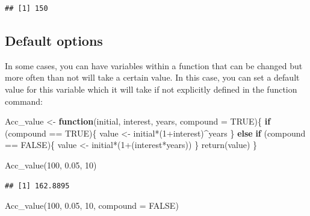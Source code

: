 \documentclass[
]{book}
\newenvironment{Shaded}{\begin{snugshade}}{\end{snugshade}}
\newcommand{\AttributeTok}[1]{\textcolor[rgb]{0.77,0.63,0.00}{#1}}
\newcommand{\ConstantTok}[1]{\textcolor[rgb]{0.00,0.00,0.00}{#1}}
\newcommand{\ControlFlowTok}[1]{\textcolor[rgb]{0.13,0.29,0.53}{\textbf{#1}}}
\newcommand{\DecValTok}[1]{\textcolor[rgb]{0.00,0.00,0.81}{#1}}
\newcommand{\FloatTok}[1]{\textcolor[rgb]{0.00,0.00,0.81}{#1}}
\newcommand{\FunctionTok}[1]{\textcolor[rgb]{0.00,0.00,0.00}{#1}}
\newcommand{\NormalTok}[1]{#1}
\newcommand{\OtherTok}[1]{\textcolor[rgb]{0.56,0.35,0.01}{#1}}
\newcommand{\SpecialCharTok}[1]{\textcolor[rgb]{0.00,0.00,0.00}{#1}}
\theoremstyle{definition}
\theoremstyle{definition}
\theoremstyle{definition}
\theoremstyle{definition}
\theoremstyle{remark}
\begin{document}
\begin{verbatim}
## [1] 150
\end{verbatim}

\hypertarget{default-options}{%
\subsection{Default options}\label{default-options}}

In some cases, you can have variables within a function that can be changed but more often than not will take a certain value. In this case, you can set a default value for this variable which it will take if not explicitly defined in the function command:

\begin{Shaded}
\begin{Highlighting}[]
\NormalTok{Acc\_value }\OtherTok{\textless{}{-}} \ControlFlowTok{function}\NormalTok{(initial, interest, years, }\AttributeTok{compound =} \ConstantTok{TRUE}\NormalTok{)\{}
  \ControlFlowTok{if}\NormalTok{ (compound }\SpecialCharTok{==} \ConstantTok{TRUE}\NormalTok{)\{}
\NormalTok{    value }\OtherTok{\textless{}{-}}\NormalTok{ initial}\SpecialCharTok{*}\NormalTok{(}\DecValTok{1}\SpecialCharTok{+}\NormalTok{interest)}\SpecialCharTok{\^{}}\NormalTok{years}
\NormalTok{  \} }\ControlFlowTok{else} \ControlFlowTok{if}\NormalTok{ (compound }\SpecialCharTok{==} \ConstantTok{FALSE}\NormalTok{)\{}
\NormalTok{    value }\OtherTok{\textless{}{-}}\NormalTok{ initial}\SpecialCharTok{*}\NormalTok{(}\DecValTok{1}\SpecialCharTok{+}\NormalTok{(interest}\SpecialCharTok{*}\NormalTok{years))}
\NormalTok{  \}}
  \FunctionTok{return}\NormalTok{(value)}
\NormalTok{\}}


\FunctionTok{Acc\_value}\NormalTok{(}\DecValTok{100}\NormalTok{, }\FloatTok{0.05}\NormalTok{, }\DecValTok{10}\NormalTok{)}
\end{Highlighting}
\end{Shaded}

\begin{verbatim}
## [1] 162.8895
\end{verbatim}

\begin{Shaded}
\begin{Highlighting}[]
\FunctionTok{Acc\_value}\NormalTok{(}\DecValTok{100}\NormalTok{, }\FloatTok{0.05}\NormalTok{, }\DecValTok{10}\NormalTok{, }\AttributeTok{compound =} \ConstantTok{FALSE}\NormalTok{)}
\end{Highlighting}
\end{Shaded}
\end{document}
